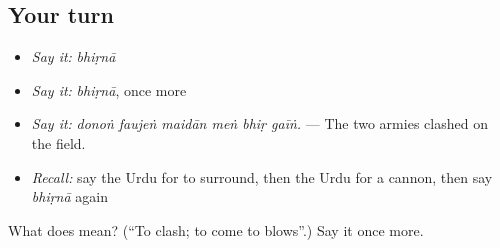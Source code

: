 \subsection*{Your turn}
\begin{itemize}
\raggedright
  \item \emph{Say it:} \emph{bhiṛnā}
  \item \emph{Say it:} \emph{bhiṛnā}, once more
  \item \emph{Say it:} \emph{donoṅ faujeṅ maidān meṅ bhiṛ gaīṅ.} — The two armies clashed on the field.
  \item \emph{Recall:} say the Urdu for to surround, then the Urdu for a cannon, then say \emph{bhiṛnā} again
\end{itemize}

\begin{tcolorbox}[breakable,colback=teal!4,colframe=teal!35!black,title={Before you move on}]
What does  mean? (\textquotedblleft{}To clash; to come to blows\textquotedblright{}.) Say it once more.
\end{tcolorbox}
